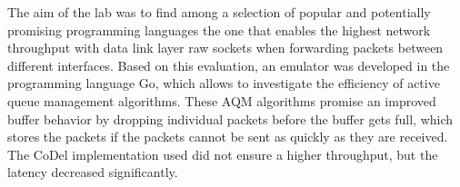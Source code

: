 The aim of the lab was to find among a selection of popular and potentially promising programming languages the one that enables the highest network throughput with data link layer raw sockets when forwarding packets between different interfaces. Based on this evaluation, an emulator was developed in the programming language Go, which allows to investigate the efficiency of active queue management algorithms. These AQM algorithms promise an improved buffer behavior by dropping individual packets before the buffer gets full, which stores the packets if the packets cannot be sent as quickly as they are received. The CoDel implementation used did not ensure a higher throughput, but the latency decreased significantly.
